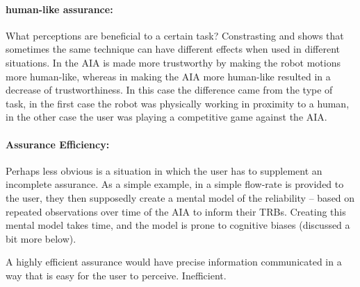     \paragraph{human-like assurance:} What perceptions are beneficial to a certain task? Constrasting \cite{Dragan2013-wd} and \cite{Wu2016-ei} shows that sometimes the same technique can have different effects when used in different situations. In \cite{Dragan2013-wd} the AIA is made more trustworthy by making the robot motions more human-like, whereas in \cite{Wu2016-ei} making the AIA more human-like resulted in a decrease of trustworthiness. In this case the difference came from the type of task, in the first case the robot was physically working in proximity to a human, in the other case the user was playing a competitive game against the AIA.


    \paragraph{Assurance Efficiency:} Perhaps less obvious is a situation in which the user has to supplement an incomplete assurance.  As a simple example, in \cite{Muir1994-ow} a simple flow-rate is provided to the user, they then supposedly create a mental model of the reliability -- based on repeated observations over time of the AIA to inform their TRBs. Creating this mental model takes time, and the model is prone to cognitive biases (discussed a bit more below).

    A highly efficient assurance would have precise information communicated in a way that is easy for the user to perceive. Inefficient. 
    

